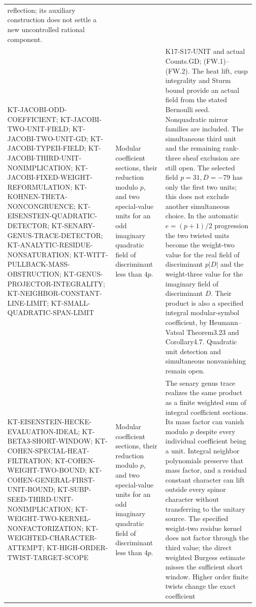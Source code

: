 \begin{longtable}{>{\raggedright\arraybackslash}p{}
>{\raggedright\arraybackslash}p{}
>{\raggedright\arraybackslash}p{}}
reflection; its auxiliary construction does not settle a new
uncontrolled rational component.\\
KT-JACOBI-ODD-COEFFICIENT;
KT-JACOBI-TWO-UNIT-FIELD;
KT-JACOBI-TWO-UNIT-GD; KT-JACOBI-TYPEII-FIELD;
KT-JACOBI-THIRD-UNIT-NONIMPLICATION;
KT-JACOBI-FIXED-WEIGHT-REFORMULATION;
KT-KOHNEN-THETA-NONCONGRUENCE;
KT-EISENSTEIN-QUADRATIC-DETECTOR;
KT-SENARY-GENUS-TRACE-DETECTOR;
KT-ANALYTIC-RESIDUE-NONSATURATION;
KT-WITT-PULLBACK-MASS-OBSTRUCTION;
KT-GENUS-PROJECTOR-INTEGRALITY;
KT-NEIGHBOR-CONSTANT-LINE-LIMIT;
KT-SMALL-QUADRATIC-SPAN-LIMIT &
Modular coefficient sections, their reduction modulo $p$,
and two special-value units for an odd imaginary quadratic
field of discriminant less than $4p$. &
K17-S17-UNIT and actual Counts.GD; (FW.1)--(FW.2).
The heat lift, cusp integrality and Sturm bound provide an
actual field from the stated Bernoulli seed. Nonquadratic
mirror families are included. The simultaneous third unit
and the remaining rank-three sheaf exclusion are still open.
The selected field $p=31,D=-79$ has only the first two units;
this does not exclude another simultaneous choice. In the
automatic $e=(p+1)/2$ progression the two twisted units become
the weight-two value for the real field of discriminant $p|D|$
and the weight-three value for the imaginary field of
discriminant $D$. Their product is also a specified integral modular-symbol coefficient,
by Heumann--Vatsal Theorem3.23 and Corollary4.7. Quadratic
unit detection and simultaneous nonvanishing remain open.\\
KT-EISENSTEIN-HECKE-EVALUATION-IDEAL;
KT-BETA3-SHORT-WINDOW;
KT-COHEN-SPECIAL-HEAT-FILTRATION;
KT-COHEN-WEIGHT-TWO-BOUND;
KT-COHEN-GENERAL-FIRST-UNIT-BOUND;
KT-SUBP-SEED-THIRD-UNIT-NONIMPLICATION;
KT-WEIGHT-TWO-KERNEL-NONFACTORIZATION;
KT-WEIGHTED-CHARACTER-ATTEMPT;
KT-HIGH-ORDER-TWIST-TARGET-SCOPE &
Modular coefficient sections, their reduction modulo $p$,
and two special-value units for an odd imaginary quadratic
field of discriminant less than $4p$. &
The senary genus trace realizes the same product as a finite
weighted sum of integral coefficient sections. Its mass factor
can vanish modulo $p$ despite every individual coefficient being
a unit. Integral neighbor polynomials preserve that mass factor,
and a residual constant character can lift outside every spinor
character without transferring to the unitary source. The specified
weight-two residue kernel does not factor through the third value;
the direct weighted Burgess estimate misses the sufficient short
window. Higher order finite twists change the exact coefficient

\end{longtable}
